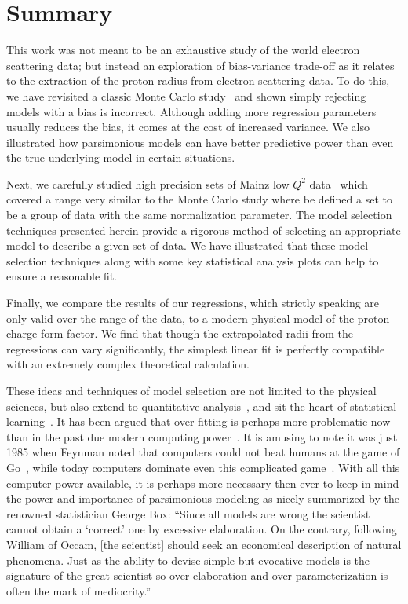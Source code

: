 \documentclass[10pt,superscriptaddress,aps,prc,twocolumn]{revtex4-1}
\begin{document}
\section{Summary}

This work was not meant to be an exhaustive study of the world electron scattering data; but 
instead an exploration of bias-variance trade-off as it relates to the extraction of the proton 
radius from electron scattering data.
To do this, we have revisited a classic Monte Carlo study~\cite{Borkowski:1975ume} and shown
simply rejecting models with a bias is incorrect.
Although adding more regression parameters usually reduces the bias, it comes at the cost of increased variance.
We also illustrated how parsimonious models can have better 
predictive power than even the true underlying model in certain situations. 

Next, we carefully studied high precision sets of Mainz low $Q^2$ data~\cite{Bernauer:2010wm} 
which covered a range very similar to the Monte Carlo study where be defined a set to be a
group of data with the same normalization parameter.  The model selection techniques
presented herein provide a rigorous method of selecting an appropriate model to describe a given set of data.  
We have illustrated that these model selection techniques along with some key statistical 
analysis plots can help to ensure a reasonable fit.   

Finally, we compare the results of our regressions, which strictly speaking are only valid over the
range of the data, to a modern physical model of the proton charge form factor.
We find that though the extrapolated radii from the regressions can vary significantly, the simplest
linear fit is perfectly compatible with an extremely complex theoretical calculation.

These ideas and techniques of model selection are not limited to the physical sciences, but also extend
to quantitative analysis~\cite{Brighton:2015}, and sit the heart of statistical 
learning~\cite{Hastie:2009}.  It has been argued that over-fitting is perhaps more problematic now than
in the past due modern computing power~\cite{Cawley:2010}.   It is amusing to note it
was just 1985 when Feynman noted that computers could not beat humans at the
game of Go~\cite{Feynman:2008}, while today computers dominate even this complicated game~\cite{Silver:2016,Barradas:2018}.
With all this computer power available, it is perhaps more necessary then ever
to keep in mind the power and importance of parsimonious modeling as nicely 
summarized by the renowned statistician George Box: 
``Since all models are wrong the scientist cannot obtain a `correct' one
by excessive elaboration.  On the contrary, following William of Occam, 
[the scientist] should seek an economical description of natural phenomena. 
Just as the ability to devise simple but evocative models is the signature of the
great scientist so over-elaboration and over-parameterization is often
the mark of mediocrity.''~\cite{Box76}
\end{document}
